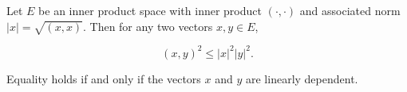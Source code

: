Let $E$ be an inner product space with inner product $(\cdot, \cdot)$ and associated norm $|x| = \sqrt{(x, x)}$. Then for any two vectors $x, y \in E$,

$$(x, y)^2 \leq |x|^2 |y|^2.$$

Equality holds if and only if the vectors $x$ and $y$ are linearly dependent.
